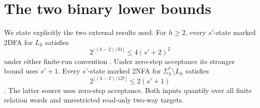 \documentclass[11pt]{article}
\begin{document}
\section{The two binary lower bounds}
We state explicitly the two external results used. For $h\ge2$, every
$s'$-state marked 2DFA for $L_h$ satisfies
\begin{equation}\label{eq:inputD}
 2^{\lfloor(h-2)/31\rfloor}\le4(s'+2)^2
\end{equation}
under either finite-run convention
\cite[Theorem~1.1]{OAI:An-exponential-two-way-deterministic-state-lower-bound-for-one-way-liveness-September-25-2026}.
Under zero-step acceptance its stronger bound uses $s'+1$.
Every $s'$-state marked 2NFA for $\Sigma_h^*\setminus L_h$ satisfies
\begin{equation}\label{eq:inputC}
 2^{\lfloor(h-2)/127\rfloor}\le2(s'+1)
\end{equation}
\cite[Theorem~1.1]{OAI:An-exponential-state-lower-bound-for-two-way-nondeterministic-complementation-September-25-2026}.
The latter source uses zero-step acceptance. Both inputs quantify over all
finite relation words and unrestricted read-only two-way targets.
\end{document}
